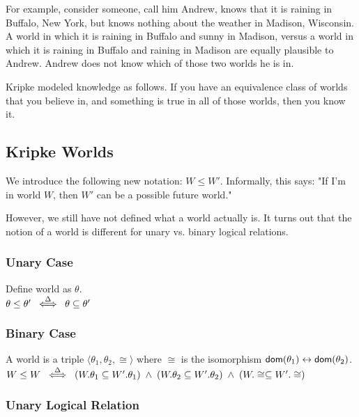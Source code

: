 \documentclass{notes}
\begin{document}
For example, consider someone, call him Andrew, knows that it is raining in Buffalo, New York, but knows nothing about the weather in Madison, Wisconsin.
A world in which it is raining in Buffalo and sunny in Madison, versus a world in which it is raining in Buffalo and raining in Madison are equally plausible to Andrew.
Andrew does not know which of those two worlds he is in.

Kripke modeled knowledge as follows.
If you have an equivalence class of worlds that you believe in, and something is true in all of those worlds, then you know it. \\

\subsection{Kripke Worlds}

We introduce the following new notation: $W \leq W'$.
Informally, this says: "If I'm in world $W$, then $W'$ can be a possible future world."

However, we still have not defined what a world actually is.
It turns out that the notion of a world is different for unary vs. binary logical relations.

\subsubsection{Unary Case}

Define world as $\theta$. \\

$\theta \leq \theta' \; \overset{\Delta}{\iff} \; \theta \subseteq \theta'$

\subsubsection{Binary Case}

A world is a triple $\langle \theta_1, \theta_2, \cong \rangle$ where $\cong$ is the isomorphism $\textsf{dom}(\theta_1) \leftrightarrow \textsf{dom}(\theta_2)$. \\

$W \leq W \; \overset{\Delta}{\iff} \; 
  (W.\theta_1 \subseteq W'.\theta_1) \; \land \; (W.\theta_2 \subseteq W'.\theta_2) \; \land \; (W.\cong \subseteq W'.\cong)
$

\subsubsection{Unary Logical Relation}
\end{document}
